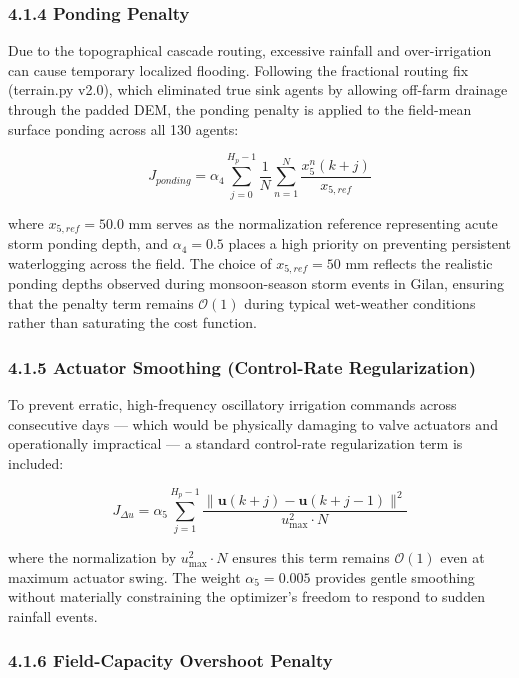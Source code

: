 \subsubsection{4.1.4 Ponding Penalty}\label{ponding-penalty}

Due to the topographical cascade routing, excessive rainfall and
over-irrigation can cause temporary localized flooding. Following the
fractional routing fix (terrain.py v2.0), which eliminated true sink
agents by allowing off-farm drainage through the padded DEM, the ponding
penalty is applied to the field-mean surface ponding across all 130
agents:

\[J_{ponding} = \alpha_4 \sum_{j=0}^{H_p-1} \frac{1}{N} \sum_{n=1}^N \frac{x_5^n(k+j)}{x_{5,ref}} \tag{13}\]

where \(x_{5,ref} = 50.0\) mm serves as the normalization reference
representing acute storm ponding depth, and \(\alpha_4 = 0.5\) places a
high priority on preventing persistent waterlogging across the field.
The choice of \(x_{5,ref} = 50\) mm reflects the realistic ponding
depths observed during monsoon-season storm events in Gilan, ensuring
that the penalty term remains \(\mathcal{O}(1)\) during typical
wet-weather conditions rather than saturating the cost function.

\subsubsection{4.1.5 Actuator Smoothing (Control-Rate
Regularization)}\label{actuator-smoothing-control-rate-regularization}

To prevent erratic, high-frequency oscillatory irrigation commands
across consecutive days --- which would be physically damaging to valve
actuators and operationally impractical --- a standard control-rate
regularization term is included:

\[J_{\Delta u} = \alpha_5 \sum_{j=1}^{H_p-1} \frac{\| \mathbf{u}(k+j) - \mathbf{u}(k+j-1) \|^2}{u_{\max}^2 \cdot N} \tag{14}\]

where the normalization by \(u_{\max}^2 \cdot N\) ensures this term
remains \(\mathcal{O}(1)\) even at maximum actuator swing. The weight
\(\alpha_5 = 0.005\) provides gentle smoothing without materially
constraining the optimizer's freedom to respond to sudden rainfall
events.

\subsubsection{4.1.6 Field-Capacity Overshoot
Penalty}\label{field-capacity-overshoot-penalty}

